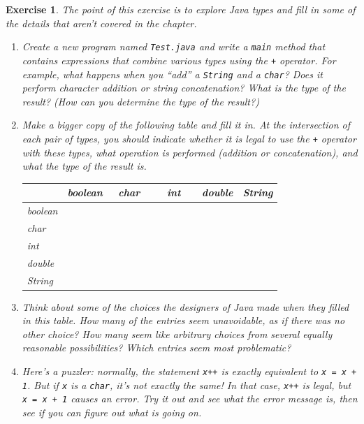 \documentclass[12pt]{book}
\theoremstyle{exercise}
\newtheorem{exercise}{Exercise}[chapter]
\newcommand{\java}[1]{\verb"#1"}
\newcommand{\java}[1]{\lstinline{#1}} %
\begin{document}
\begin{exercise}

The point of this exercise is to explore Java types and fill in some of the details that aren't covered in the chapter.

\begin{enumerate}


\item Create a new program named {\tt Test.java} and write a \java{main} method that contains expressions that combine various types using the \java{+} operator.
For example, what happens when you ``add'' a \java{String} and a \java{char}?
Does it perform character addition or string concatenation?
What is the type of the result?
(How can you determine the type of the result?)

\item Make a bigger copy of the following table and fill it in.
At the intersection of each pair of types, you should indicate whether it is legal to use the \java{+} operator with these types, what operation is performed (addition or concatenation), and what the type of the result is.

\begin{center}
\begin{tabular}{|l|l|l|l|l|l|} \hline
        &  boolean  &  ~char~  &  ~~int~~  &  double  &  String \\ \hline
boolean &           &          &           &          &         \\ \hline
char    &           &          &           &          &         \\ \hline
int     &           &          &           &          &         \\ \hline
double  &           &          &           &          &         \\ \hline
String  &           &          &           &          &         \\ \hline
\end{tabular}
\end{center}

\item Think about some of the choices the designers of Java made when they filled in this table.
How many of the entries seem unavoidable, as if there was no other choice?
How many seem like arbitrary choices from several equally reasonable possibilities?
Which entries seem most problematic?

\item Here's a puzzler: normally, the statement \java{x++} is exactly equivalent to \java{x = x + 1}.
But if \java{x} is a \java{char}, it's not exactly the same!
In that case, \java{x++} is legal, but \java{x = x + 1} causes an error.
Try it out and see what the error message is, then see if you can figure out what is going on.


\end{enumerate}
\end{exercise}
\end{document}

